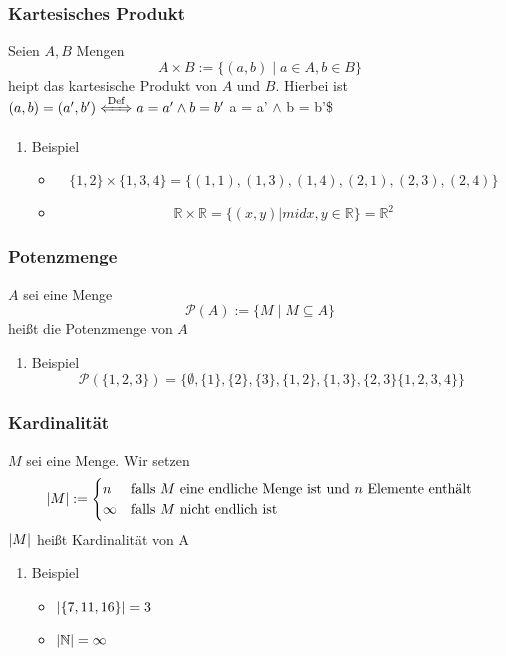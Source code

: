 \documentclass[11pt]{article}
\DeclarePairedDelimiter\abs{\lvert}{\rvert}%
\begin{document}
\subsubsection{Kartesisches Produkt}
\label{sec-2-4-11}
Seien $A,B$ Mengen
\[A\times B := \{(a,b)\mid a\in A, b\in B\}\]
heipt das kartesische Produkt von $A$ und $B$. Hierbei ist $(a,b) = (a',b') \xLeftrightarrow{\text{Def}} a = a' \wedge b = b'$ a = a' $\wedge$ b = b'\$

\begin{enumerate}
\item Beispiel
\label{sec-2-4-11-1}
\begin{itemize}
\item \[\{1,2\}\times \{1,3,4\} = \{(1,1),(1,3),(1,4),(2,1),(2,3),(2,4)\}\]
\item \[\mathbb{R}\times\mathbb{R}=\{(x,y)|mid x,y \in \mathbb{R}\} = \mathbb{R}^2\]
\end{itemize}
\end{enumerate}
\subsubsection{Potenzmenge}
\label{sec-2-4-12}
$A$ sei eine Menge
\[\mathcal{P} (A) := \{M\mid M\subseteq A\}\]
heißt die Potenzmenge von $A$
\begin{enumerate}
\item Beispiel
\label{sec-2-4-12-1}
\[\mathcal{P} (\{1,2,3\}) =  \{\emptyset, \{1\}, \{2\},\{3\},\{1,2\},\{1,3\},\{2,3\}\{1,2,3,4\}\}\]
\end{enumerate}
\subsubsection{Kardinalität}
\label{sec-2-4-13}
$M$ sei eine Menge. Wir setzen
\[\abs{M} := \begin{cases} n & \text{falls $M$ eine endliche Menge ist und $n$ Elemente enthält} \\ \infty & \text{falls $M$ nicht endlich ist} \end{cases}\]
$\abs{M}$ heißt Kardinalität von A
\begin{enumerate}
\item Beispiel
\label{sec-2-4-13-1}
\begin{itemize}
\item $\abs{\{7,11,16\}} = 3$
\item $\abs{\mathbb{N}} = \infty$
\end{itemize}
\end{enumerate}
\end{document}
